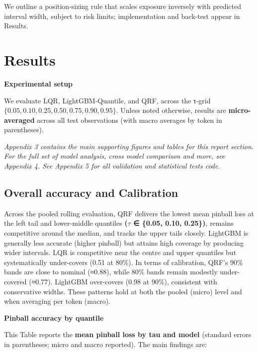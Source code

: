 \documentclass[
  a4paper,
  DIV=11,
  numbers=noendperiod]{scrreprt}
\begin{document}
We outline a position-sizing rule that scales exposure inversely with
predicted interval width, subject to risk limits; implementation and
back-test appear in Results.


\chapter{Results}\label{results}

\textbf{Experimental setup}

We evaluate LQR, LightGBM-Quantile, and QRF, across the τ-grid
\(\{0.05,0.10,0.25,0.50,0.75,0.90,0.95\}\). Unless noted otherwise,
results are \textbf{micro-averaged} across all test observations (with
macro averages by token in parentheses).

\emph{Appendix 3 contains the main supporting figures and tables for
this report section. For the full set of model analysis, cross model
comparison and more, see Appendix 4. See Appendix 5 for all validation
and statistical tests code.}

\section{Overall accuracy and
Calibration}\label{overall-accuracy-and-calibration}

Across the pooled rolling evaluation, QRF delivers the lowest mean
pinball loss at the left tail and lower-middle quantiles
\textbf{(\(\tau\) ∈ \{0.05, 0.10, 0.25\})}, remains competitive around
the median, and tracks the upper tails closely. LightGBM is generally
less accurate (higher pinball) but attains high coverage by producing
wider intervals. LQR is competitive near the centre and upper quantiles
but systematically under-covers (0.51 at 80\%). In terms of calibration,
QRF's 90\% bands are close to nominal (≈0.88), while 80\% bands remain
modestly under-covered (≈0.77). LightGBM over-covers (0.98 at 90\%),
consistent with conservative widths. These patterns hold at both the
pooled (micro) level and when averaging per token (macro).

\textbf{Pinball accuracy by quantile}

This Table reports the \textbf{mean pinball loss by tau and model}
(standard errors in parentheses; micro and macro reported). The main
findings are:
\end{document}
